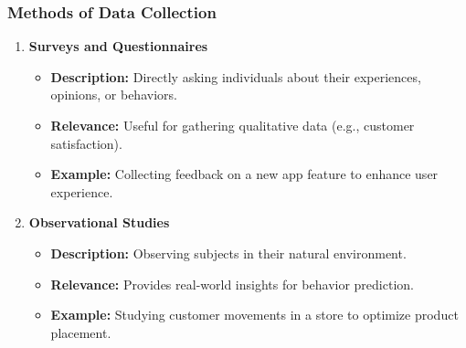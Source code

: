\documentclass[aspectratio=169]{beamer}
\begin{document}
\begin{frame}[fragile]
    \frametitle{Methods of Data Collection}
    \begin{enumerate}
        \item \textbf{Surveys and Questionnaires}
            \begin{itemize}
                \item \textbf{Description:} Directly asking individuals about their experiences, opinions, or behaviors.
                \item \textbf{Relevance:} Useful for gathering qualitative data (e.g., customer satisfaction).
                \item \textbf{Example:} Collecting feedback on a new app feature to enhance user experience.
            \end{itemize}
        
        \item \textbf{Observational Studies}
            \begin{itemize}
                \item \textbf{Description:} Observing subjects in their natural environment.
                \item \textbf{Relevance:} Provides real-world insights for behavior prediction.
                \item \textbf{Example:} Studying customer movements in a store to optimize product placement.
            \end{itemize}
    \end{enumerate}
\end{frame}
\end{document}
